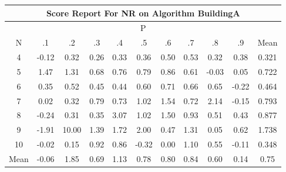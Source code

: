 \documentclass[11pt,a4paper]{report}
\begin{document}
\begin{longtable}{ | c || c | c | c | c | c | c | c | c | c || c |}
\hline
\multicolumn{11}{|c|}{ Score Report For NR on Algorithm BuildingA} \\
\hline
\multicolumn{11}{|c|}{ P } \\
\hline
N & .1 & .2 & .3 & .4 & .5 & .6 & .7 & .8 & .9 & Mean\\
 \hline
 \hline
 \endhead
  4 &  \cellcolor[HTML]{FFFFFF} -0.12 &  \cellcolor[HTML]{F7F7FF} 0.32 &  \cellcolor[HTML]{F7F7FF} 0.26 &  \cellcolor[HTML]{F7F7FF} 0.33 &  \cellcolor[HTML]{F7F7FF} 0.36 &  \cellcolor[HTML]{EFEFFF} 0.50 &  \cellcolor[HTML]{EFEFFF} 0.53 &  \cellcolor[HTML]{F7F7FF} 0.32 &  \cellcolor[HTML]{F7F7FF} 0.38 & 0.321 \\
  5 &  \cellcolor[HTML]{D7D7FF} 1.47 &  \cellcolor[HTML]{DFDFFF} 1.31 &  \cellcolor[HTML]{EFEFFF} 0.68 &  \cellcolor[HTML]{EFEFFF} 0.76 &  \cellcolor[HTML]{EFEFFF} 0.79 &  \cellcolor[HTML]{E7E7FF} 0.86 &  \cellcolor[HTML]{EFEFFF} 0.61 &  \cellcolor[HTML]{FFFFFF} -0.03 &  \cellcolor[HTML]{FFFFFF} 0.05 & 0.722 \\
  6 &  \cellcolor[HTML]{F7F7FF} 0.35 &  \cellcolor[HTML]{EFEFFF} 0.52 &  \cellcolor[HTML]{F7F7FF} 0.45 &  \cellcolor[HTML]{F7F7FF} 0.44 &  \cellcolor[HTML]{EFEFFF} 0.60 &  \cellcolor[HTML]{EFEFFF} 0.71 &  \cellcolor[HTML]{EFEFFF} 0.66 &  \cellcolor[HTML]{EFEFFF} 0.65 &  \cellcolor[HTML]{FFF7F7} -0.22 & 0.464 \\
  7 &  \cellcolor[HTML]{FFFFFF} 0.02 &  \cellcolor[HTML]{F7F7FF} 0.32 &  \cellcolor[HTML]{EFEFFF} 0.79 &  \cellcolor[HTML]{EFEFFF} 0.73 &  \cellcolor[HTML]{E7E7FF} 1.02 &  \cellcolor[HTML]{D7D7FF} 1.54 &  \cellcolor[HTML]{EFEFFF} 0.72 &  \cellcolor[HTML]{C7C7FF} 2.14 &  \cellcolor[HTML]{FFFFFF} -0.15 & 0.793 \\
  8 &  \cellcolor[HTML]{FFF7F7} -0.24 &  \cellcolor[HTML]{F7F7FF} 0.31 &  \cellcolor[HTML]{F7F7FF} 0.35 &  \cellcolor[HTML]{AFAFFF} 3.07 &  \cellcolor[HTML]{E7E7FF} 1.02 &  \cellcolor[HTML]{D7D7FF} 1.50 &  \cellcolor[HTML]{E7E7FF} 0.93 &  \cellcolor[HTML]{EFEFFF} 0.51 &  \cellcolor[HTML]{F7F7FF} 0.43 & 0.877 \\
  9 &  \cellcolor[HTML]{FFCFCF} -1.91 &  \cellcolor[HTML]{0808FF} 10.00 &  \cellcolor[HTML]{DFDFFF} 1.39 &  \cellcolor[HTML]{D7D7FF} 1.72 &  \cellcolor[HTML]{CFCFFF} 2.00 &  \cellcolor[HTML]{F7F7FF} 0.47 &  \cellcolor[HTML]{DFDFFF} 1.31 &  \cellcolor[HTML]{FFFFFF} 0.05 &  \cellcolor[HTML]{EFEFFF} 0.62 & 1.738 \\
  10 &  \cellcolor[HTML]{FFFFFF} -0.02 &  \cellcolor[HTML]{FFFFFF} 0.15 &  \cellcolor[HTML]{E7E7FF} 0.92 &  \cellcolor[HTML]{E7E7FF} 0.86 &  \cellcolor[HTML]{FFF7F7} -0.32 &  \cellcolor[HTML]{FFFFFF} 0.00 &  \cellcolor[HTML]{E7E7FF} 1.10 &  \cellcolor[HTML]{EFEFFF} 0.55 &  \cellcolor[HTML]{FFFFFF} -0.11 & 0.348 \\
 \hline
 \hline
Mean &  \cellcolor[HTML]{FFFFFF} -0.06 &  \cellcolor[HTML]{CFCFFF} 1.85 &  \cellcolor[HTML]{EFEFFF} 0.69 &  \cellcolor[HTML]{DFDFFF} 1.13 &  \cellcolor[HTML]{EFEFFF} 0.78 &  \cellcolor[HTML]{E7E7FF} 0.80 &  \cellcolor[HTML]{E7E7FF} 0.84 &  \cellcolor[HTML]{EFEFFF} 0.60 &  \cellcolor[HTML]{FFFFFF} 0.14 &  \cellcolor[HTML]{EFEFFF} 0.75
\end{longtable}
\end{document}
